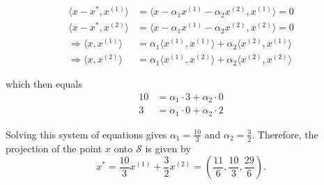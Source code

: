 \begin{homeworkProblem}
\begin{solution}
    \[
        \begin{split}
            \langle x - x^*, x^{(1)} \rangle &= \langle x - \alpha_1 x^{(1)} 
            - \alpha_2 x^{(2)}, x^{(1)} \rangle = 0 \\
            \langle x - x^*, x^{(2)} \rangle &= \langle x - \alpha_1 x^{(1)} 
            - \alpha_2 x^{(2)}, x^{(2)} \rangle = 0 \\
            \Rightarrow \langle x, x^{(1)} \rangle &= \alpha_1 \langle x^{(1)}, 
            x^{(1)} \rangle + \alpha_2 \langle x^{(2)}, x^{(1)} \rangle \\
            \Rightarrow \langle x, x^{(2)} \rangle &= \alpha_1 \langle x^{(1)}, 
            x^{(2)} \rangle + \alpha_2 \langle x^{(2)}, x^{(2)} \rangle
        \end{split}
    \]

    which then equals
    \[
        \begin{split}
            10 &= \alpha_1 \cdot 3 + \alpha_2 \cdot 0 \\
            3 &= \alpha_1 \cdot 0 + \alpha_2 \cdot 2
        \end{split}
    \]

    Solving this system of equations gives $\alpha_1 = \frac{10}{3}$ and 
    $\alpha_2 = \frac{3}{2}$. Therefore, the projection of the point $x$ 
    onto $\mathcal S$ is given by 
    $$x^* = \frac{10}{3} x^{(1)} + \frac{3}{2} x^{(2)} = 
    \left(\frac{11}{6}, \frac{10}{3}, \frac{29}{6}\right).$$

\end{solution}

\end{homeworkProblem}